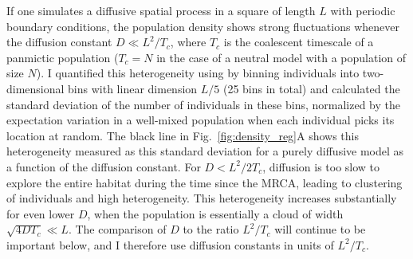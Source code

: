 \documentclass[aps,rmp, twocolumn]{revtex4}
\begin{document}
If one simulates a diffusive spatial process in a square of length $L$ with periodic boundary conditions, the population density shows strong fluctuations whenever the diffusion constant $D\ll L^2/T_c$, where $T_c$ is the coalescent timescale of a panmictic population ($T_c=N$ in the case of a neutral model with a population of size $N$).
I quantified this heterogeneity using by binning individuals into two-dimensional bins with linear dimension $L/5$ (25 bins in total) and calculated the standard deviation of the number of individuals in these bins, normalized by the expectation variation in a well-mixed population when each individual picks its location at random.
The black line in Fig.~\ref{fig:density_reg}A shows this heterogeneity measured as this standard deviation for a purely diffusive model as a function of the diffusion constant.
For $D < L^2/2T_c$, diffusion is too slow to explore the entire habitat during the time since the MRCA, leading to clustering of individuals and high heterogeneity.
This heterogeneity increases substantially for even lower $D$, when the population is essentially a cloud of width $\sqrt{4DT_c}\ll L$.
The comparison of $D$ to the ratio $L^2/T_c$ will continue to be important below, and I therefore use diffusion constants in units of $L^2/T_c$.
\end{document}
